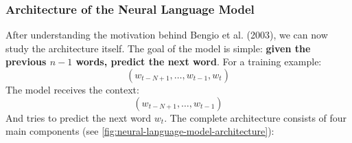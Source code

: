 \subsubsection{Architecture of the Neural Language Model}\label{sec:architecture-of-the-neural-language-model}

After understanding the motivation behind Bengio et al. (2003), we can now study the architecture itself. The goal of the model is simple: \textbf{given the previous $n-1$ words, predict the next word}. For a training example:
\begin{equation*}
    \left(w_{t-N+1}, \dots, w_{t-1}, w_t\right)
\end{equation*}
The model receives the context:
\begin{equation*}
    \left(w_{t-N+1}, \dots, w_{t-1}\right)
\end{equation*}
And tries to predict the next word $w_t$. The complete architecture consists of four main components (see \autoref{fig:neural-language-model-architecture}):
